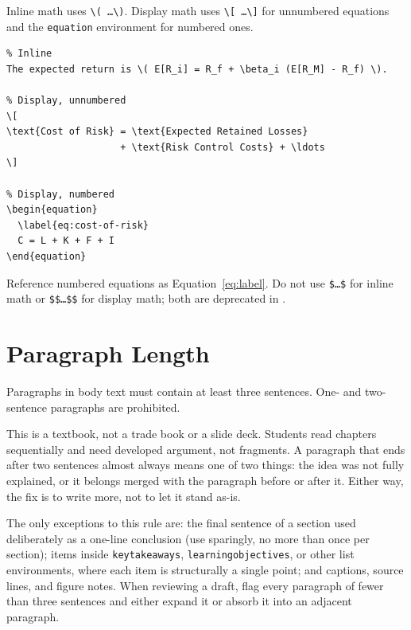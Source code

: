\documentclass[11pt,openany]{book}
\newcommand{\code}[1]{\texttt{\small #1}}
\begin{document}
Inline math uses \code{\textbackslash( \ldots \textbackslash)}. Display math uses \code{\textbackslash[ \ldots \textbackslash]} for unnumbered equations and the \code{equation} environment for numbered ones.

\begin{lstlisting}
% Inline
The expected return is \( E[R_i] = R_f + \beta_i (E[R_M] - R_f) \).

% Display, unnumbered
\[
\text{Cost of Risk} = \text{Expected Retained Losses}
                    + \text{Risk Control Costs} + \ldots
\]

% Display, numbered
\begin{equation}
  \label{eq:cost-of-risk}
  C = L + K + F + I
\end{equation}
\end{lstlisting}

Reference numbered equations as Equation~\eqref{eq:label}. Do not use \code{\$\ldots\$} for inline math or \code{\$\$\ldots\$\$} for display math; both are deprecated in \LaTeXe.


\section{Paragraph Length}
\label{sec:paragraphs}

Paragraphs in body text must contain at least three sentences. One- and two-sentence paragraphs are prohibited.

This is a textbook, not a trade book or a slide deck. Students read chapters sequentially and need developed argument, not fragments. A paragraph that ends after two sentences almost always means one of two things: the idea was not fully explained, or it belongs merged with the paragraph before or after it. Either way, the fix is to write more, not to let it stand as-is.

The only exceptions to this rule are: the final sentence of a section used deliberately as a one-line conclusion (use sparingly, no more than once per section); items inside \code{keytakeaways}, \code{learningobjectives}, or other list environments, where each item is structurally a single point; and captions, source lines, and figure notes. When reviewing a draft, flag every paragraph of fewer than three sentences and either expand it or absorb it into an adjacent paragraph.


\end{document}
